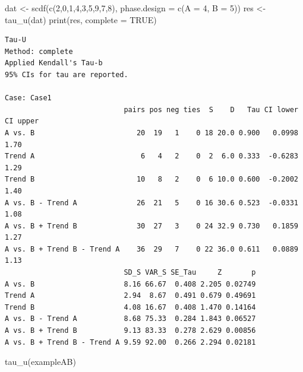 \documentclass[
]{book}
\newenvironment{Shaded}{\begin{snugshade}}{\end{snugshade}}
\newcommand{\AttributeTok}[1]{\textcolor[rgb]{0.77,0.63,0.00}{#1}}
\newcommand{\ConstantTok}[1]{\textcolor[rgb]{0.00,0.00,0.00}{#1}}
\newcommand{\DecValTok}[1]{\textcolor[rgb]{0.00,0.00,0.81}{#1}}
\newcommand{\FunctionTok}[1]{\textcolor[rgb]{0.00,0.00,0.00}{#1}}
\newcommand{\NormalTok}[1]{#1}
\newcommand{\OtherTok}[1]{\textcolor[rgb]{0.56,0.35,0.01}{#1}}
\begin{document}
\begin{Shaded}
\begin{Highlighting}[]
\NormalTok{dat }\OtherTok{\textless{}{-}} \FunctionTok{scdf}\NormalTok{(}\FunctionTok{c}\NormalTok{(}\DecValTok{2}\NormalTok{,}\DecValTok{0}\NormalTok{,}\DecValTok{1}\NormalTok{,}\DecValTok{4}\NormalTok{,}\DecValTok{3}\NormalTok{,}\DecValTok{5}\NormalTok{,}\DecValTok{9}\NormalTok{,}\DecValTok{7}\NormalTok{,}\DecValTok{8}\NormalTok{), }\AttributeTok{phase.design =} \FunctionTok{c}\NormalTok{(}\AttributeTok{A =} \DecValTok{4}\NormalTok{, }\AttributeTok{B =} \DecValTok{5}\NormalTok{))}
\NormalTok{res }\OtherTok{\textless{}{-}} \FunctionTok{tau\_u}\NormalTok{(dat)}
\FunctionTok{print}\NormalTok{(res, }\AttributeTok{complete =} \ConstantTok{TRUE}\NormalTok{)}
\end{Highlighting}
\end{Shaded}

\begin{verbatim}
Tau-U
Method: complete 
Applied Kendall's Tau-b
95% CIs for tau are reported.

Case: Case1 
                            pairs pos neg ties  S    D   Tau CI lower CI upper
A vs. B                        20  19   1    0 18 20.0 0.900   0.0998     1.70
Trend A                         6   4   2    0  2  6.0 0.333  -0.6283     1.29
Trend B                        10   8   2    0  6 10.0 0.600  -0.2002     1.40
A vs. B - Trend A              26  21   5    0 16 30.6 0.523  -0.0331     1.08
A vs. B + Trend B              30  27   3    0 24 32.9 0.730   0.1859     1.27
A vs. B + Trend B - Trend A    36  29   7    0 22 36.0 0.611   0.0889     1.13
                            SD_S VAR_S SE_Tau     Z       p
A vs. B                     8.16 66.67  0.408 2.205 0.02749
Trend A                     2.94  8.67  0.491 0.679 0.49691
Trend B                     4.08 16.67  0.408 1.470 0.14164
A vs. B - Trend A           8.68 75.33  0.284 1.843 0.06527
A vs. B + Trend B           9.13 83.33  0.278 2.629 0.00856
A vs. B + Trend B - Trend A 9.59 92.00  0.266 2.294 0.02181
\end{verbatim}

\begin{Shaded}
\begin{Highlighting}[]
\FunctionTok{tau\_u}\NormalTok{(exampleAB)}
\end{Highlighting}
\end{Shaded}
\end{document}
